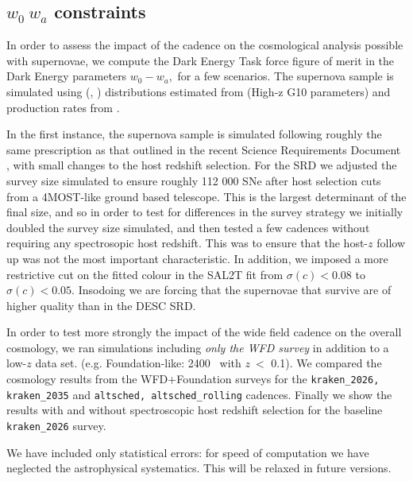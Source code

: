 \subsection{$w_0~w_a$ constraints}


In order to assess the impact of the cadence on the cosmological analysis possible with supernovae, we compute the Dark Energy Task force figure of merit \cite{2006astro.ph..9591A} in the Dark Energy parameters $w_0-w_a,$ for a few scenarios. The supernova sample is simulated using (\strech, \sncolor) distributions estimated from \cite{2016ApJ...822L..35S} (High-z G10 parameters) and production rates from  \cite{2008ApJ...682..262D}.

In the first instance, the supernova sample is simulated following roughly the same prescription as that outlined in the recent Science Requirements Document \cite{2018arXiv180901669T}, with small changes to the host redshift selection. For the SRD we adjusted the survey size simulated to ensure roughly 112 000 SNe after host selection cuts from a 4MOST-like ground based telescope. This is the largest determinant of the final size, and so in order to test for differences in the survey strategy we initially doubled the survey size simulated, and then tested a few cadences without requiring any spectrosopic host redshift. This was to ensure that the host-$z$ follow up was not the most important characteristic.
In addition, we imposed a more restrictive cut on the fitted colour in the SAL2T fit from $\sigma(c) < 0.08$ to $\sigma(c) < 0.05.$ Insodoing we are forcing that the supernovae that survive are of higher quality than in the DESC SRD.

In order to test more strongly the impact of the wide field cadence on the overall cosmology, we ran simulations including \textit{only the WFD survey} in addition to a low-$z$ data set. (e.g.  Foundation-like: 2400 \sne~with $z~\less$ 0.1). We compared the cosmology results from the WFD+Foundation surveys for the {\tt kraken\_2026, kraken\_2035} and {\tt altsched, altsched\_rolling} cadences. Finally we show the results with and without spectroscopic host redshift selection for the baseline {\tt kraken\_2026} survey.

We have included only statistical errors: for speed of computation we have neglected the astrophysical systematics. This will be relaxed in future versions.


